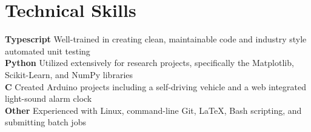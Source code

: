 \documentclass[letterpaper,11pt]{article}
\begin{document}
 \section{Technical Skills}
  \begin{itemize}[leftmargin=0.0in, label={}]
     \small{\item{
      \textbf{Typescript} \hspace{0.3in} {Well-trained in creating clean, maintainable code and industry style automated unit testing} {\vspace{0.015in}}\\
      \textbf{Python} {\hspace{0.588in}}{Utilized extensively for research projects, specifically the Matplotlib, Scikit-Learn, and NumPy libraries} \vspace{0.015in}\\
      \textbf{C} {\hspace{0.945in}} {Created Arduino projects including a self-driving vehicle and a web integrated light-sound alarm clock} \vspace{0.015in}\\
      \textbf{Other} {\hspace{0.7025in}}{Experienced with Linux, command-line Git, \LaTeX, Bash scripting, and submitting batch jobs} \\
     }}
  \end{itemize}









\begin{comment}

\section{Awards}
\begin{itemize}[leftmargin=0.0in, label={}]
	\small{\item{
			\textbf{Research:} {2x International Science and Engineering Fair Finalist, Regeneron Science Talent Search Semifinalist} \\
			\textbf{Olympiads:} {Princeton University Physics Tournament Top 25 Individual, University of Alabama Physics Competition Champion, 2x U.S.A. Physics Olympiad Semifinalist, American Invitation Mathematics Examination Qualifier} \\

	}}
\end{itemize}
\end{comment}




  
\end{document}
